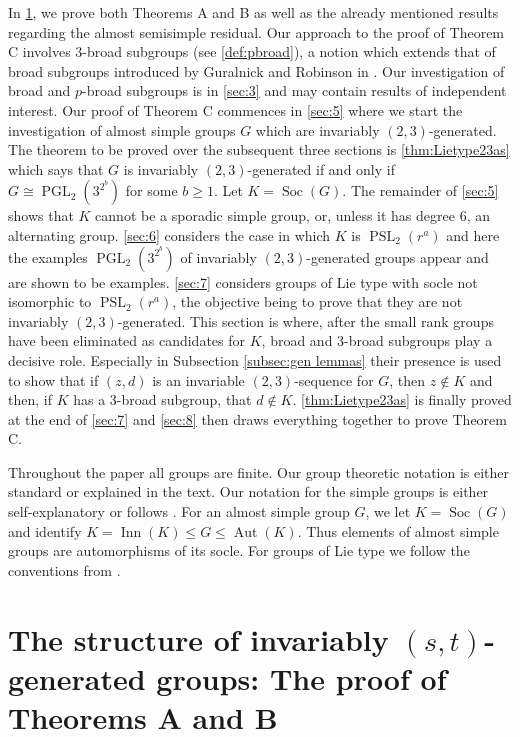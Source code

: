 \documentclass[12pt,a4paper]{amsart}
\DeclareMathOperator{\Aut}{Aut}
\DeclareMathOperator{\Inn}{Inn}
\DeclareMathOperator{\PGL}{PGL}
\DeclareMathOperator{\PSL}{PSL}
\DeclareMathOperator{\Soc}{Soc}
\begin{document}
In \cref{sec:2}, we prove both Theorems A and B as well as the already mentioned results regarding the almost semisimple residual.  Our approach to the proof of Theorem C involves $3$-broad subgroups (see \cref{def:pbroad}), a notion which extends that of broad subgroups introduced by Guralnick and Robinson in \cite{GuralnickRobinson1}. Our investigation of broad and $p$-broad subgroups is in \cref{sec:3} and may contain results of independent interest. Our proof of Theorem C commences in \cref{sec:5} where we start the investigation of almost simple groups $G$ which are invariably $(2,3)$-generated. The theorem to be proved over the subsequent three sections is \cref{thm:Lietype23as}  which says that $G$ is invariably $(2,3)$-generated if and only if $G\cong \PGL_2(3^{2^b})$ for some $b \ge 1$. Let $K=\Soc(G)$. The remainder of \cref{sec:5} shows that $K$ cannot be a sporadic simple group, or, unless it has degree $6$, an alternating group. \cref{sec:6} considers the case in which $K$ is $\PSL_2(r^a)$ and here the examples $\PGL_2(3^{2^b})$ of invariably $(2,3)$-generated groups appear and are shown to be examples. \cref{sec:7} considers groups of Lie type with socle not isomorphic to $\PSL_2(r^a)$, the objective being to prove that they are not invariably $(2,3)$-generated. This section is where, after the small rank groups have been eliminated as candidates for $K$, broad and $3$-broad subgroups play a decisive role. Especially in Subsection \ref{subsec:gen lemmas} their presence is used to  show that if $(z,d)$ is an invariable $(2,3)$-sequence for $G$, then $z\not \in K$ and then, if $K$ has a $3$-broad subgroup, that $d\not \in K$. \cref{thm:Lietype23as} is finally proved at the end of \cref{sec:7} and \cref{sec:8} then draws everything together to prove Theorem C.

Throughout the paper all groups are finite. Our group theoretic notation is either standard or explained in the text. Our notation for the simple groups is either self-explanatory or follows \cite{GLS3}.  For an almost simple group $G$, we let $K=\Soc(G)$ and identify $K=\Inn(K) \le G\le \Aut(K)$.  Thus elements of almost simple groups are automorphisms of its socle.
For groups of Lie type we   follow the conventions from \cite{GLS3}.






\section{The structure of invariably $(s,t)$-generated groups: The proof of Theorems A and B}\label{sec:2}
\end{document}
